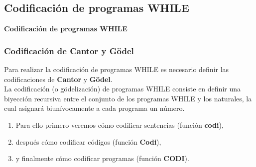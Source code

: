 \documentclass[xcolor=table]{beamer}
\begin{document}
\subsection{Codificación de programas WHILE}
\begin{frame}  \Large

\begin{center}
    \textbf{Codificación de programas WHILE}
\end{center}

\end{frame} 


\begin{frame}[fragile]\frametitle{Codificación de Cantor y Gödel} 

Para realizar la codificación de programas WHILE es necesario definir las codificaciones de \textbf{Cantor} y \textbf{Gödel}.\\

La codificación (o gödelización) de programas WHILE consiste en definir una biyección recursiva entre el conjunto de los programas WHILE y los naturales, la cual asignará biunívocamente a cada programa un número.

\begin{enumerate}
    \item  Para ello primero veremos cómo codificar sentencias (función \textbf{codi}),
    \item después cómo codificar códigos (función \textbf{Codi}),
    \item y finalmente cómo codificar programas (función \textbf{CODI}).
\end{enumerate}
\end{frame}
\end{document}
